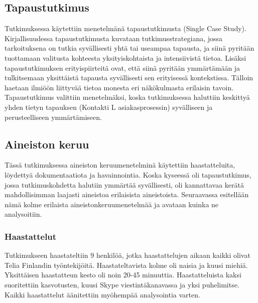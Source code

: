 \documentclass[finnish,12pt,a4paper,pdftex]{article}
\begin{document}
\subsection{Tapaustutkimus}
Tutkimuksessa käytettiin menetelmänä tapaustutkimusta (Single Case Study). Kirjallisuudessa tapaustutkimusta kuvataan tutkimusstrategiana, jossa tarkoituksena on tutkia syvällisesti yhtä tai useampaa tapausta, ja siinä pyritään tuottamaan valitusta kohteesta yksityiskohtaista ja intensiivistä tietoa.
Lisäksi tapaustutkimuksen erityispiirteitä ovat, että siinä pyritään ymmärtämään ja tulkitsemaan yksittäistä tapausta syvällisesti sen erityisessä kontekstissa. Tälloin haetaan ilmiöön liittyvää tietoa monesta eri näkökulmasta erilaisin tavoin. \citep{eskola} Tapaustutkimus valittiin menetelmäksi, koska tutkimuksessa haluttiin keskittyä yhden tietyn tapauksen (Kontakti L asiakasprosessin) syvälliseen ja perusteelliseen ymmärtämiseen. 


\subsection{Aineiston keruu}
Tässä tutkimuksessa aineiston keruumenetelminä käytettiin haastatteluita, löydettyä dokumentaatiota ja havainnointia. Koska kyseessä oli tapaustutkimus, jossa tutkimuskohdetta halutiin ymmärtää syvällisesti, oli kannattavaa kerätä mahdollisimman laajasti aineistoa erilaisista aineistoista. Seuraavassa esitellään nämä kolme erilaista aineistonkeruumenetelmää ja avataan kuinka ne analysoitiin.

\subsubsection{Haastattelut}
Tutkimukseen haastateltiin 9 henkilöä, jotka haastattelujen aikaan kaikki olivat Telia Finlandin työntekijöitä. Haastateltavista kolme oli naisia ja kuusi miehiä. Yksittäisen haastatteun kesto oli noin 20-45 minuuttia. Haastatteluista kaksi suoritettiin kasvotusten, kuusi Skype viestintäkanavassa ja yksi puhelimitse. Kaikki haastattelut äänitettiin myöhempää analysointia varten. \\
\end{document}
